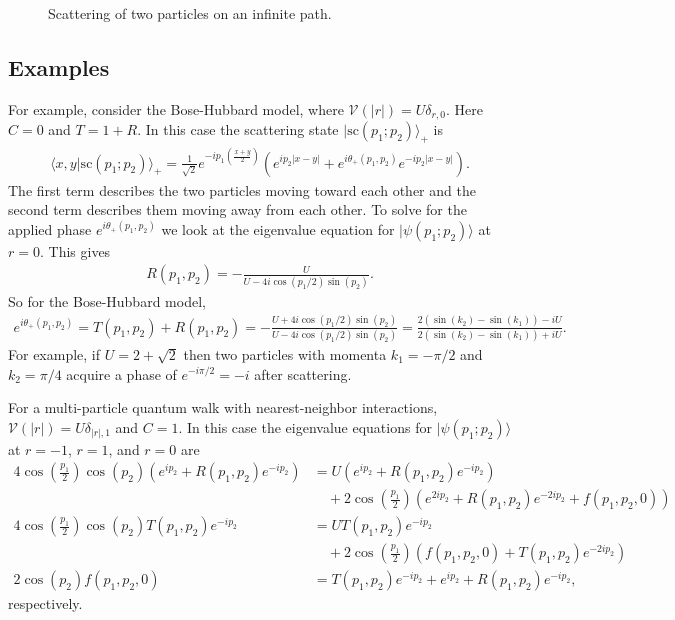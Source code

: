 \documentclass[../thesis-main/thesis-main]{subfiles}
\begin{document}
\begin{figure}
  \centering
  
  \caption{Scattering of two particles on an infinite path.}
  \label{fig:wte}
\end{figure}


\subsection{Examples}


For example, consider the Bose-Hubbard model, where $\mathcal{V}(|r|) = U\delta_{r,0}$. Here $C=0$ and $T=1+R$.  In this case the scattering state $|\mathrm{sc}(p_1;p_2)\rangle_+$ is
\begin{align}
\langle x,y|\mathrm{sc}(p_1;p_2)\rangle_+=\frac{1}{\sqrt{2}}e^{-ip_1 \left(\frac{x+y}{2}\right)}\left(e^{ip_2 |x-y|}+e^{i\theta_+(p_1,p_2)}e^{-ip_2 |x-y|}\right).
\end{align}
The first term describes the two particles moving toward each other and the second term describes them moving away from each other. To solve for the applied phase $e^{i\theta_+(p_1,p_2)}$ we look at the eigenvalue equation for $|\psi(p_1;p_2)\rangle$ at $r=0$. This gives
\begin{align}
  R(p_1,p_2) =- \frac{U}{U - 4i\cos({p_1}/{2})\sin(p_2)}.
\end{align}
So for the Bose-Hubbard model,
\begin{align}
  e^{i \theta_{+} (p_1,p_2)} = T(p_1,p_2) + R(p_1,p_2) = - \frac{ U + 4 i \cos({p_1}/{2}) \sin(p_2)}{U - 4 i \cos({p_1}/{2}) \sin(p_2)} =  \frac{2 \left(\sin(k_2) - \sin(k_1)\right) - i U}{2 \left(\sin(k_2) - \sin(k_1)\right) + i U}.
\end{align}
For example, if $U = 2+\sqrt{2}$ then two particles with momenta $k_1 =-{ \pi}/{2}$ and $k_2={\pi}/{4}$ acquire a phase of $e^{-i\pi/2}= -i$ after scattering.

For a multi-particle quantum walk with nearest-neighbor interactions, $\mathcal{V}(|r|)=U\delta_{|r|,1}$ and $C=1$.  In this case the eigenvalue equations for $|\psi(p_1;p_2)\rangle$ at $r=-1$, $r=1$, and $r=0$ are
\begin{align*}
 4 \cos\left(\frac{p_1}{2}\right)  \cos(p_2) ( e^{i p_2} + R(p_1,p_2) e^{-i p_2} ) &= U ( e^{i p_2} + R(p_1,p_2) e^{-i p_2}) \\
& \quad + 2\cos\left(\frac{p_1}{2}\right) \left( e^{2i p_2} + R(p_1,p_2) e^{-2i p_2}+f(p_1,p_2,0)\right) \\
 4 \cos\left(\frac{p_1}{2}\right)  \cos(p_2) T(p_1,p_2) e^{-ip_2} & =UT(p_1,p_2)e^{-ip_2}\\
& \quad +2\cos \left(\frac{p_1}{2}\right)\left(f(p_1,p_2,0)+T(p_1,p_2)e^{-2ip_2}\right)\\
2 \cos(p_2) f(p_1,p_2,0) &=T(p_1,p_2)e^{-ip_2}+e^{ip_2}+R(p_1,p_2)e^{-ip_2},
\end{align*}
respectively.
\end{document}
